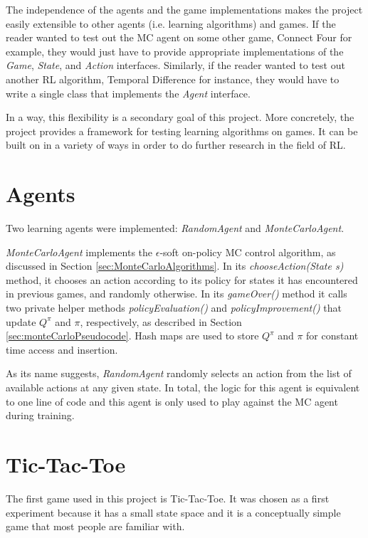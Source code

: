 \documentclass[11pt,a4paper]{report}
\begin{document}
The independence of the agents and the game implementations makes the project easily extensible to other agents (i.e. learning algorithms) and games. If the reader wanted to test out the MC agent on some other game, Connect Four for example, they would just have to provide appropriate implementations of the \emph{Game}, \emph{State}, and \emph{Action} interfaces. Similarly, if the reader wanted to test out another RL algorithm, Temporal Difference for instance, they would have to  write a single class that implements the \emph{Agent} interface.

In a way, this flexibility is a secondary goal of this project. More concretely, the project provides a framework for testing learning algorithms on games. It can be built on in a variety of ways in order to do further research in the field of RL.


\section{Agents}
\label{sec:Agents}

Two learning agents were implemented: \emph{RandomAgent} and \emph{MonteCarloAgent}.

\emph{MonteCarloAgent} implements the $\epsilon$-soft on-policy MC control algorithm, as discussed in Section \ref{sec:MonteCarloAlgorithms}. In its \emph{chooseAction(State s)} method, it chooses an action according to its policy for states it has encountered in previous games, and randomly otherwise. In its \emph{gameOver()} method it calls two private helper methods \emph{policyEvaluation()} and \emph{policyImprovement()} that update $Q^{\pi}$ and $\pi$, respectively, as described in Section \ref{sec:monteCarloPseudocode}. Hash maps are used to store $Q^{\pi}$ and $\pi$ for constant time access and insertion.

As its name suggests, \emph{RandomAgent} randomly selects an action from the list of available actions at any given state. In total, the logic for this agent is equivalent to one line of code and this agent is only used to play against the MC agent during training.


\section{Tic-Tac-Toe}
\label{sec:TicTacToe}

The first game used in this project is Tic-Tac-Toe. It was chosen as a first experiment because it has a small state space and it is a conceptually simple game that most people are familiar with.
\end{document}
